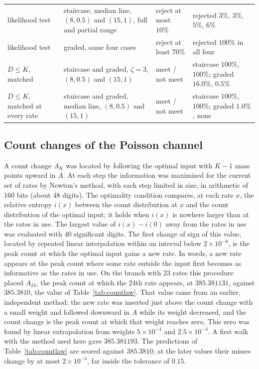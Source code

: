 \documentclass[10pt,letterpaper]{article}
\begin{document}
\begin{table}[tp]
\begin{tabular}{>{\raggedright\arraybackslash}p{3.0cm}>{\raggedright\arraybackslash}p{5.0cm}>{\raggedright\arraybackslash}p{2.2cm}>{\raggedright\arraybackslash}p{3.6cm}}
likelihood test & staircase, median line, $(8,0.5)$ and $(15,1)$, full and partial range & reject at most $10\%$ & rejected $3\%$, $3\%$, $5\%$, $6\%$\\
likelihood test & graded, same four cases & reject at least $70\%$ & rejected $100\%$ in all four\\
$D\le K$, matched & staircase and graded, $\zeta=3$, $(8,0.5)$ and $(15,1)$ & meet / not meet & staircase $100\%$, $100\%$; graded $16.0\%$, $0.5\%$\\
$D\le K$, matched at every rate & staircase and graded, median line, $(8,0.5)$ and $(15,1)$ & meet / not meet & staircase $100\%$, $100\%$; graded $1.0\%$, none\\
\hline
\end{tabular}
\end{table}

\subsection{Count changes of the Poisson channel}
A count change $A_K$ was located by following the optimal input with $K-1$ mass points upward in $A$. At each step the information was
maximized for the current set of rates by Newton's method, with each step limited in size, in arithmetic of 160 bits (about 48
digits). The optimality condition compares, at
each rate $x$, the relative entropy $i(x)$ between the count distribution at $x$ and the count distribution of the optimal input; it
holds when $i(x)$ is nowhere larger than at the rates in use. The largest value of $i(x)-i(0)$ away from the rates in use was
evaluated with 40 significant digits. The first change of sign of this value, located by repeated linear interpolation within an interval below
$2\times10^{-6}$, is the peak count at which the optimal input gains a new rate. In words, a new rate appears at the peak count
where some rate outside the input first becomes as informative as the rates in use. On the branch with 23 rates this procedure
placed $A_{24}$, the peak count at which the 24th rate appears, at $385.381131$, against $385.3810$, the value of
Table~\ref{tab:countlaw}. That value came from an earlier, independent method: the new rate was inserted just above the count
change with a small weight and followed downward in $A$ while its weight decreased, and the count change is the peak count at which
that weight reaches zero. This zero was found by linear extrapolation from weights $5\times10^{-4}$ and $2.5\times10^{-4}$. A first walk with the
method used here gave $385.381193$. The predictions of Table~\ref{tab:countlaw} are scored against $385.3810$; at the later values
their misses change by at most $2\times10^{-4}$, far inside the tolerance of $0.15$.
\end{document}
